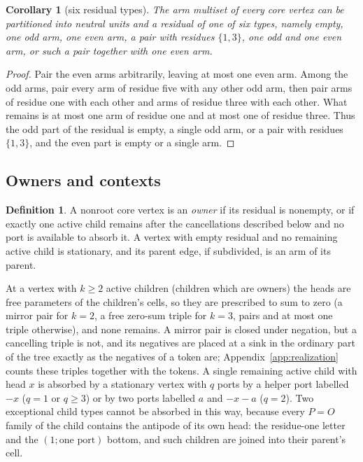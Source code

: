 \documentclass[11pt,a4paper]{article}
\theoremstyle{plain}
\newtheorem{corollary}[theorem]{Corollary}
\theoremstyle{definition}
\newtheorem{definition}[theorem]{Definition}
\theoremstyle{remark}
\newcommand{\PO}{P\!=\!O}
\begin{document}
\begin{corollary}[six residual types]\label{cor:sixtypes}
The arm multiset of every core vertex can be partitioned into neutral units
and a \emph{residual} of one of six types, namely empty, one odd arm, one even
arm, a pair with residues $\{1,3\}$, one odd and one even arm, or such a pair
together with one even arm.
\end{corollary}

\begin{proof}
Pair the even arms arbitrarily, leaving at most one even arm.  Among the odd
arms, pair every arm of residue five with any other odd arm, then pair arms of
residue one with each other and arms of residue three with each other.  What
remains is at most one arm of residue one and at most one of residue three.
Thus the odd part of the residual is empty, a single odd arm, or a pair with
residues $\{1,3\}$, and the even part is empty or a single arm.
\end{proof}

\subsection{Owners and contexts}

\begin{definition}\label{def:owner}
A nonroot core vertex is an \emph{owner} if its residual is nonempty, or if
exactly one active child remains after the cancellations described below and
no port is available to absorb it.  A vertex with empty residual and no
remaining active child is stationary, and its parent edge, if subdivided, is an
arm of its parent.
\end{definition}

At a vertex with $k\ge 2$ active children (children which are owners) the
heads are free parameters of the children's cells, so they are prescribed to
sum to zero (a mirror pair for $k=2$, a free zero-sum triple for $k=3$, pairs
and at most one triple otherwise), and none remains.  A mirror pair is closed
under negation, but a cancelling triple is not, and its negatives are placed at
a sink in the ordinary part of the tree exactly as the negatives of a token
are; Appendix~\ref{app:realization} counts these triples together with the
tokens.  A single remaining active
child with head $x$ is absorbed by a stationary vertex with $q$ ports by a
helper port labelled $-x$ ($q=1$ or $q\ge 3$) or by two ports labelled $a$ and
$-x-a$ ($q=2$).  Two exceptional child types cannot be absorbed in this way,
because every $\PO$ family of the child contains the antipode of its own head:
the residue-one letter and the $(1;\text{one port})$ bottom, and such children
are joined into their parent's cell.
\end{document}
